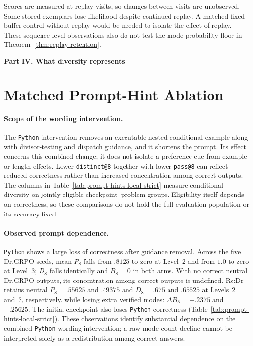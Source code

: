 Scores are measured at replay visits, so changes between visits are
unobserved. Some stored exemplars lose likelihood despite continued replay.
A matched fixed-buffer control without replay would be needed to isolate
the effect of replay. These sequence-level observations also do not test
the mode-probability floor in Theorem~\ref{thm:replay-retention}.

\clearpage
{}
\begin{center}\large\textbf{Part IV. What diversity represents}\end{center}

\section{Matched Prompt-Hint Ablation}
\label{app:prompt-hint-ablation}



\paragraph{Scope of the wording intervention.}
The \texttt{Python} intervention removes an executable nested-conditional example
along with divisor-testing and dispatch guidance, and it shortens the prompt.
Its effect concerns this combined change; it does not isolate a preference
cue from example or length effects. Lower \texttt{distinct@8} together with
lower \texttt{pass@8} can reflect reduced correctness rather than increased
concentration among correct outputs. The \pmd{} columns in
Table~\ref{tab:prompt-hints-local-strict} measure conditional diversity on
jointly eligible checkpoint--problem groups. Eligibility itself depends on
correctness, so these comparisons do not hold the full evaluation population
or its accuracy fixed.

\paragraph{Observed prompt dependence.}
\texttt{Python} shows a large loss of correctness after guidance removal. Across the
five Dr.GRPO seeds, mean $P_8$ falls from $.8125$ to zero at Level~2 and from
$1.0$ to zero at Level~3; $D_8$ falls identically and $B_8=0$ in both arms.
With no correct neutral Dr.GRPO outputs, its concentration among correct outputs
is undefined. Re:Dr retains neutral $P_8=.55625$ and $.49375$ and
$D_8=.675$ and $.65625$ at Levels~2 and~3, respectively, while losing
extra verified modes: $\Delta B_8=-.2375$ and $-.25625$. The initial checkpoint
also loses \texttt{Python} correctness (Table~\ref{tab:prompt-hints-local-strict}).
These observations identify substantial dependence on the combined \texttt{Python}
wording intervention; a raw mode-count decline cannot be interpreted solely
as a redistribution among correct answers.



